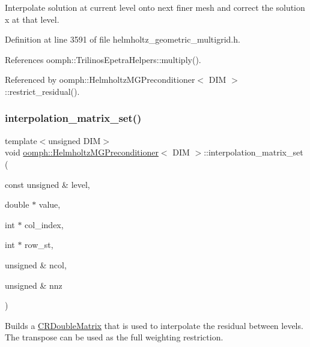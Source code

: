 Interpolate solution at current level onto next finer mesh and correct the solution x at that level. 



Definition at line 3591 of file helmholtz\+\_\+geometric\+\_\+multigrid.\+h.



References oomph\+::\+Trilinos\+Epetra\+Helpers\+::multiply().



Referenced by oomph\+::\+Helmholtz\+M\+G\+Preconditioner$<$ D\+I\+M $>$\+::restrict\+\_\+residual().

\mbox{\label{classoomph_1_1HelmholtzMGPreconditioner_a2c7591ae2de4d1c461bca085d3210e73}} 
\subsubsection{\texorpdfstring{interpolation\+\_\+matrix\+\_\+set()}{interpolation\_matrix\_set()}\hspace{0.1cm}{\footnotesize\ttfamily [1/2]}}
{\footnotesize\ttfamily template$<$unsigned D\+IM$>$ \\
void \hyperlink{classoomph_1_1HelmholtzMGPreconditioner}{oomph\+::\+Helmholtz\+M\+G\+Preconditioner}$<$ D\+IM $>$\+::interpolation\+\_\+matrix\+\_\+set (\begin{DoxyParamCaption}\item[{const unsigned \&}]{level,  }\item[{double $\ast$}]{value,  }\item[{int $\ast$}]{col\+\_\+index,  }\item[{int $\ast$}]{row\+\_\+st,  }\item[{unsigned \&}]{ncol,  }\item[{unsigned \&}]{nnz }\end{DoxyParamCaption})\hspace{0.3cm}{\ttfamily [inline]}}



Builds a \hyperlink{classoomph_1_1CRDoubleMatrix}{C\+R\+Double\+Matrix} that is used to interpolate the residual between levels. The transpose can be used as the full weighting restriction. 



